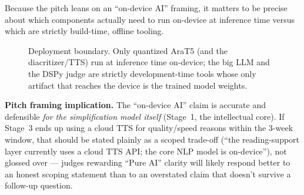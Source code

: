 \documentclass[11pt,a4paper]{article}
\begin{document}
Because the pitch leans on an ``on-device AI'' framing, it matters to be precise
about which components actually need to run on-device at inference time versus
which are strictly build-time, offline tooling.

\begin{figure}[h!]
\centering
{}
\caption{Deployment boundary. Only quantized AraT5 (and the diacritizer/TTS)
run at inference time on-device; the big LLM and the DSPy judge are strictly
development-time tools whose only artifact that reaches the device is the
trained model weights.}
\label{fig:deployment}
\end{figure}

\label{sec:deployment-note}
\begin{noteb}
\textbf{Pitch framing implication.} The ``on-device AI'' claim is accurate and
defensible \emph{for the simplification model itself} (Stage~1, the intellectual
core). If Stage~3 ends up using a cloud TTS for quality/speed reasons within the
3-week window, that should be stated plainly as a scoped trade-off (``the
reading-support layer currently uses a cloud TTS API; the core NLP model is
on-device''), not glossed over --- judges rewarding ``Pure AI'' clarity will
likely respond better to an honest scoping statement than to an overstated claim
that doesn't survive a follow-up question.
\end{noteb}
\end{document}
